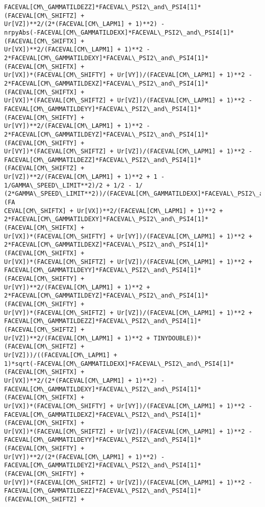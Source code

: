 \documentclass[landscape,letterpaper,10pt,english]{article}
\begin{document}
\begin{Verbatim}[commandchars=\\\{\}]
FACEVAL[CM\_GAMMATILDEZZ]*FACEVAL\_PSI2\_and\_PSI4[1]*(FACEVAL[CM\_SHIFTZ] +
Ur[VZ])**2/(2*(FACEVAL[CM\_LAPM1] + 1)**2) -
nrpyAbs(-FACEVAL[CM\_GAMMATILDEXX]*FACEVAL\_PSI2\_and\_PSI4[1]*(FACEVAL[CM\_SHIFTX] +
Ur[VX])**2/(FACEVAL[CM\_LAPM1] + 1)**2 -
2*FACEVAL[CM\_GAMMATILDEXY]*FACEVAL\_PSI2\_and\_PSI4[1]*(FACEVAL[CM\_SHIFTX] +
Ur[VX])*(FACEVAL[CM\_SHIFTY] + Ur[VY])/(FACEVAL[CM\_LAPM1] + 1)**2 -
2*FACEVAL[CM\_GAMMATILDEXZ]*FACEVAL\_PSI2\_and\_PSI4[1]*(FACEVAL[CM\_SHIFTX] +
Ur[VX])*(FACEVAL[CM\_SHIFTZ] + Ur[VZ])/(FACEVAL[CM\_LAPM1] + 1)**2 -
FACEVAL[CM\_GAMMATILDEYY]*FACEVAL\_PSI2\_and\_PSI4[1]*(FACEVAL[CM\_SHIFTY] +
Ur[VY])**2/(FACEVAL[CM\_LAPM1] + 1)**2 -
2*FACEVAL[CM\_GAMMATILDEYZ]*FACEVAL\_PSI2\_and\_PSI4[1]*(FACEVAL[CM\_SHIFTY] +
Ur[VY])*(FACEVAL[CM\_SHIFTZ] + Ur[VZ])/(FACEVAL[CM\_LAPM1] + 1)**2 -
FACEVAL[CM\_GAMMATILDEZZ]*FACEVAL\_PSI2\_and\_PSI4[1]*(FACEVAL[CM\_SHIFTZ] +
Ur[VZ])**2/(FACEVAL[CM\_LAPM1] + 1)**2 + 1 - 1/GAMMA\_SPEED\_LIMIT**2)/2 + 1/2 - 1/
(2*GAMMA\_SPEED\_LIMIT**2))/(FACEVAL[CM\_GAMMATILDEXX]*FACEVAL\_PSI2\_and\_PSI4[1]*(FA
CEVAL[CM\_SHIFTX] + Ur[VX])**2/(FACEVAL[CM\_LAPM1] + 1)**2 +
2*FACEVAL[CM\_GAMMATILDEXY]*FACEVAL\_PSI2\_and\_PSI4[1]*(FACEVAL[CM\_SHIFTX] +
Ur[VX])*(FACEVAL[CM\_SHIFTY] + Ur[VY])/(FACEVAL[CM\_LAPM1] + 1)**2 +
2*FACEVAL[CM\_GAMMATILDEXZ]*FACEVAL\_PSI2\_and\_PSI4[1]*(FACEVAL[CM\_SHIFTX] +
Ur[VX])*(FACEVAL[CM\_SHIFTZ] + Ur[VZ])/(FACEVAL[CM\_LAPM1] + 1)**2 +
FACEVAL[CM\_GAMMATILDEYY]*FACEVAL\_PSI2\_and\_PSI4[1]*(FACEVAL[CM\_SHIFTY] +
Ur[VY])**2/(FACEVAL[CM\_LAPM1] + 1)**2 +
2*FACEVAL[CM\_GAMMATILDEYZ]*FACEVAL\_PSI2\_and\_PSI4[1]*(FACEVAL[CM\_SHIFTY] +
Ur[VY])*(FACEVAL[CM\_SHIFTZ] + Ur[VZ])/(FACEVAL[CM\_LAPM1] + 1)**2 +
FACEVAL[CM\_GAMMATILDEZZ]*FACEVAL\_PSI2\_and\_PSI4[1]*(FACEVAL[CM\_SHIFTZ] +
Ur[VZ])**2/(FACEVAL[CM\_LAPM1] + 1)**2 + TINYDOUBLE))*(FACEVAL[CM\_SHIFTZ] +
Ur[VZ]))/((FACEVAL[CM\_LAPM1] +
1)*sqrt(-FACEVAL[CM\_GAMMATILDEXX]*FACEVAL\_PSI2\_and\_PSI4[1]*(FACEVAL[CM\_SHIFTX] +
Ur[VX])**2/(2*(FACEVAL[CM\_LAPM1] + 1)**2) -
FACEVAL[CM\_GAMMATILDEXY]*FACEVAL\_PSI2\_and\_PSI4[1]*(FACEVAL[CM\_SHIFTX] +
Ur[VX])*(FACEVAL[CM\_SHIFTY] + Ur[VY])/(FACEVAL[CM\_LAPM1] + 1)**2 -
FACEVAL[CM\_GAMMATILDEXZ]*FACEVAL\_PSI2\_and\_PSI4[1]*(FACEVAL[CM\_SHIFTX] +
Ur[VX])*(FACEVAL[CM\_SHIFTZ] + Ur[VZ])/(FACEVAL[CM\_LAPM1] + 1)**2 -
FACEVAL[CM\_GAMMATILDEYY]*FACEVAL\_PSI2\_and\_PSI4[1]*(FACEVAL[CM\_SHIFTY] +
Ur[VY])**2/(2*(FACEVAL[CM\_LAPM1] + 1)**2) -
FACEVAL[CM\_GAMMATILDEYZ]*FACEVAL\_PSI2\_and\_PSI4[1]*(FACEVAL[CM\_SHIFTY] +
Ur[VY])*(FACEVAL[CM\_SHIFTZ] + Ur[VZ])/(FACEVAL[CM\_LAPM1] + 1)**2 -
FACEVAL[CM\_GAMMATILDEZZ]*FACEVAL\_PSI2\_and\_PSI4[1]*(FACEVAL[CM\_SHIFTZ] +

\end{Verbatim}
\end{document}
